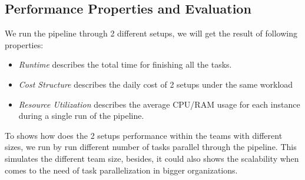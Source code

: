 \subsection{Performance Properties and Evaluation}
We run the pipeline through 2 different setups, we will get the result of following properties:
\begin{itemize}
    \item \textit{Runtime} describes the total time for finishing all the tasks.
    \item \textit{Cost Structure} describes the daily cost of 2 setups under the same workload
    \item \textit{Resource Utilization} describes the average CPU/RAM usage for each instance during a single run of the pipeline.
\end{itemize}
To shows how does the 2 setups performance within the teams with different sizes, we run by run different number of tasks parallel through the pipeline. This simulates the different team size, besides, it could also shows the scalability when comes to the need of task parallelization in bigger organizations.
